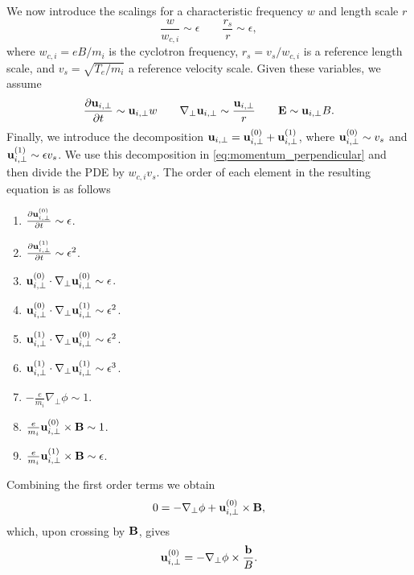 \documentclass[oneside,a4paper,11pt]{report}
\begin{document}
We now introduce the scalings for a characteristic frequency $w$ and length scale $r$
\begin{equation}
    \frac{w}{w_{c,i}} \sim \epsilon \qquad \frac{r_s}{r} \sim \epsilon,
\end{equation}
where $w_{c,i} = eB/m_i$ is the cyclotron frequency, $r_s = v_s/w_{c,i}$ is a reference length scale, and $v_s = \sqrt{T_e/m_i}$ a reference velocity scale. Given these variables, we assume
\begin{equation}
    \frac{\partial \mathbf{u}_{i,\perp}}{\partial t} \sim \mathbf{u}_{i,\perp} w \qquad \nabla_\perp \mathbf{u}_{i,\perp} \sim \frac{\mathbf{u}_{i,\perp}}{r} \qquad \mathbf{E} \sim \mathbf{u}_{i,\perp} B.
\end{equation}
Finally, we introduce the decomposition $\mathbf{u}_{i,\perp} = \mathbf{u}_{i,\perp}^{(0)} + \mathbf{u}_{i,\perp}^{(1)}$, where $\mathbf{u}_{i,\perp}^{(0)} \sim v_s$ and $\mathbf{u}_{i,\perp}^{(1)} \sim \epsilon v_s$. We use this decomposition in \cref{eq:momentum_perpendicular} and then divide the PDE by $w_{c,i} v_s$. The order of each element in the resulting equation is as follows
\begin{enumerate}
    \item $\frac{\partial \mathbf{u}_{i,\perp}^{(0)}}{\partial t} \sim \epsilon$.
    \item $\frac{\partial \mathbf{u}_{i,\perp}^{(1)}}{\partial t} \sim \epsilon^2$.
    \item $\mathbf{u}_{i,\perp}^{(0)} \cdot \nabla_\perp \mathbf{u}_{i,\perp}^{(0)} \sim \epsilon$.
    \item $\mathbf{u}_{i,\perp}^{(0)} \cdot \nabla_\perp \mathbf{u}_{i,\perp}^{(1)} \sim \epsilon^2$.
    \item $\mathbf{u}_{i,\perp}^{(1)} \cdot \nabla_\perp \mathbf{u}_{i,\perp}^{(0)} \sim \epsilon^2$.
    \item $\mathbf{u}_{i,\perp}^{(1)} \cdot \nabla_\perp \mathbf{u}_{i,\perp}^{(1)} \sim \epsilon^3$.
    \item $-\frac{e}{m_i} \nabla_\perp \phi \sim 1$.
    \item $\frac{e}{m_i} \mathbf{u}_{i,\perp}^{(0)} \times \mathbf{B} \sim 1$.
    \item $\frac{e}{m_i} \mathbf{u}_{i,\perp}^{(1)} \times \mathbf{B} \sim \epsilon$.
\end{enumerate}
Combining the first order terms we obtain
\begin{equation}
    0 = - \nabla_\perp \phi + \mathbf{u}_{i,\perp}^{(0)} \times \mathbf{B},
\end{equation}
which, upon crossing by $\mathbf{B}$, gives
\begin{equation}
\label{eq:e_cross_b_drift}
    \mathbf{u}_{i,\perp}^{(0)} = -\nabla_\perp \phi \times \frac{\mathbf{b}}{B}.
\end{equation}
\end{document}
